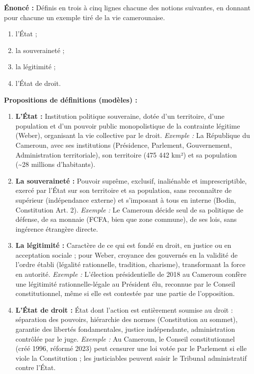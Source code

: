 \documentclass[11pt]{article}
\begin{document}
\begin{exoresolu}[Définitions]
\textbf{Énoncé :} Définis en trois à cinq lignes chacune des notions suivantes, en donnant pour chacune un exemple tiré de la vie camerounaise.
\begin{enumerate}
\item l'État ;
\item la souveraineté ;
\item la légitimité ;
\item l'État de droit.
\end{enumerate}
\tcblower
\textbf{Propositions de définitions (modèles) :}
\begin{enumerate}
\item \textbf{L'État :} Institution politique souveraine, dotée d'un territoire, d'une population et d'un pouvoir public monopolistique de la contrainte légitime (Weber), organisant la vie collective par le droit. \emph{Exemple :} La République du Cameroun, avec ses institutions (Présidence, Parlement, Gouvernement, Administration territoriale), son territoire (475 442 km²) et sa population (\textasciitilde 28 millions d'habitants).
\item \textbf{La souveraineté :} Pouvoir suprême, exclusif, inaliénable et imprescriptible, exercé par l'État sur son territoire et sa population, sans reconnaître de supérieur (indépendance externe) et s'imposant à tous en interne (Bodin, Constitution Art. 2). \emph{Exemple :} Le Cameroun décide seul de sa politique de défense, de sa monnaie (FCFA, bien que zone commune), de ses lois, sans ingérence étrangère directe.
\item \textbf{La légitimité :} Caractère de ce qui est fondé en droit, en justice ou en acceptation sociale ; pour Weber, croyance des gouvernés en la validité de l'ordre établi (légalité rationnelle, tradition, charisme), transformant la force en autorité. \emph{Exemple :} L'élection présidentielle de 2018 au Cameroun confère une légitimité rationnelle-légale au Président élu, reconnue par le Conseil constitutionnel, même si elle est contestée par une partie de l'opposition.
\item \textbf{L'État de droit :} État dont l'action est entièrement soumise au droit : séparation des pouvoirs, hiérarchie des normes (Constitution au sommet), garantie des libertés fondamentales, justice indépendante, administration contrôlée par le juge. \emph{Exemple :} Au Cameroun, le Conseil constitutionnel (créé 1996, réformé 2023) peut censurer une loi votée par le Parlement si elle viole la Constitution ; les justiciables peuvent saisir le Tribunal administratif contre l'État.
\end{enumerate}
\end{exoresolu}
\end{document}
